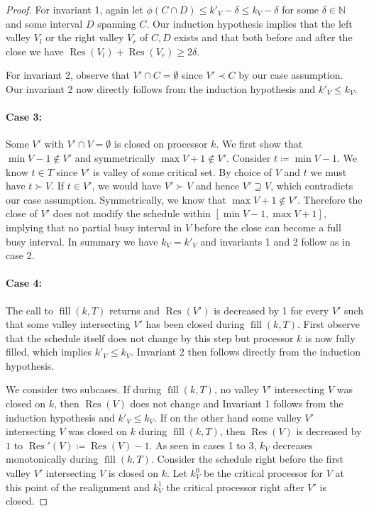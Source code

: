 \documentclass[a4paper]{article}
\DeclareMathOperator{\fillop}{fill}
\DeclareMathOperator{\res}{Res}
\begin{document}
\begin{proof}
      For invariant 1, again let $\phi(C \cap D) \leq k'_V - \delta \leq k_V - \delta$ for some $\delta \in \mathbb{N}$ and some interval $D$ spanning $C$.
      Our induction hypothesis implies that the left valley $V_l$ or the right valley $V_r$ of $C, D$ exists and that both before and after the close we have $\res(V_l) + \res(V_r) \geq 2 \delta$.

      For invariant 2, observe that $V' \cap C = \emptyset$ since $V' \prec C$ by our case assumption.
      Our invariant 2 now directly follows from the induction hypothesis and $k'_V \leq k_V$.


  \paragraph{Case 3:}
      Some $V'$ with $V' \cap V = \emptyset$ is closed on processor $k$.
      We first show that $\min V - 1 \notin V'$ and symmetrically $\max V + 1 \notin V'$.
      Consider $t \coloneqq \min V - 1$.
      We know $t \in T$ since $V'$ is valley of some critical set.
      By choice of $V$ and $t$ we must have $t \succ V$.
      If $t \in V'$, we would have $V' \succ V$ and hence $V' \supseteq V$, which contradicts our case assumption.
      Symmetrically, we know that $\max V + 1 \notin V'$.
      Therefore the close of $V'$ does not modify the schedule within $[\min V - 1, \max V + 1]$, implying that no partial busy interval in $V$ before the close can become a full busy interval.
      In summary we have $k_V = k'_V$ and invariants 1 and 2 follow as in case 2.

  \paragraph{Case 4:}
      The call to $\fillop(k, T)$ returns and $\res(V')$ is decreased by 1 for every $V'$ such that some valley intersecting $V'$ has been closed during $\fillop(k, T)$.
      First observe that the schedule itself does not change by this step but processor $k$ is now fully filled, which implies $k'_V \leq k_V$.
      Invariant 2 then follows directly from the induction hypothesis.

      We consider two subcases.
      If during $\fillop(k, T)$, no valley $V'$ intersecting $V$ was closed on $k$, then $\res(V)$ does not change and Invariant 1 follows from the induction hypothesis and $k'_V \leq k_V$.
      If on the other hand some valley $V'$ intersecting $V$ was closed on $k$ during $\fillop(k, T)$, then $\res(V)$ is decreased by $1$ to $\res'(V) \coloneqq \res(V) - 1$.
      As seen in cases 1 to 3, $k_V$ decreases monotonically during $\fillop(k, T)$.
      Consider the schedule right before the first valley $V'$ intersecting $V$ is closed on $k$.
      Let $k^0_V$ be the critical processor for $V$ at this point of the realignment and $k^1_V$ the critical processor right after $V'$ is closed.


\end{proof}
\end{document}
